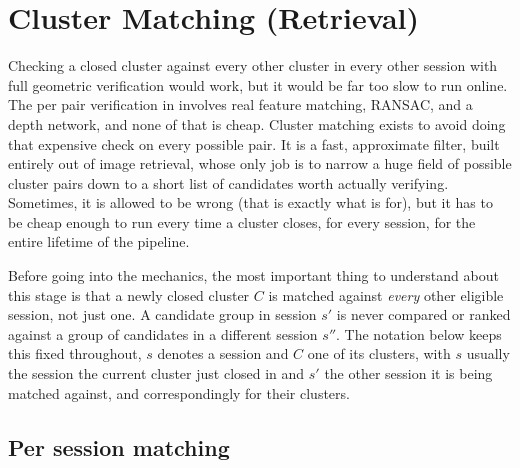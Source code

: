 \section{Cluster Matching (Retrieval)}
\label{sec:method-cluster-matching}

Checking a closed cluster against every other cluster in every other session with full
geometric verification would work, but it would be far too slow to run online. The per pair
verification in  involves real feature matching, RANSAC,
and a depth network, and none of that is cheap. Cluster matching exists to avoid doing that
expensive check on every possible pair. It is a fast, approximate filter, built entirely out
of image retrieval, whose only job is to narrow a huge field of possible cluster pairs down to
a short list of candidates worth actually verifying. Sometimes, it is allowed to be wrong (that
is exactly what  is for), but it has to be cheap enough to
run every time a cluster closes, for every session, for the entire lifetime of the pipeline.

Before going into the mechanics, the most important thing to understand about this stage is
that a newly closed cluster $C$ is matched against \emph{every} other eligible session, not
just one. A candidate group in session $s'$ is never compared or ranked against a group of
candidates in a different session $s''$. The notation below keeps this fixed throughout, $s$
denotes a session and $C$ one of its clusters, with $s$ usually the session the current cluster
just closed in and $s'$ the other session it is being matched against, and correspondingly for
their clusters.

\subsection{Per session matching}

